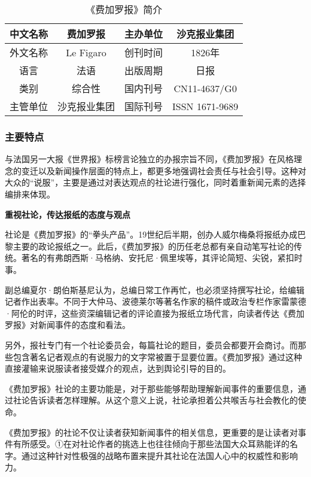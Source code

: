 \documentclass[a4paper,openany]{book}
\begin{document}
\begin{table}[ht]
\setlength{\belowcaptionskip}{5pt}
\caption{《费加罗报》简介}
\centering
\begin{tabular}{|c|c|c|c|}
\hline
中文名称 & 费加罗报      & 主办单位 & 沙克报业集团         \\ \hline
外文名称 & Le Figaro & 创刊时间 & 1826年          \\ \hline
语言   & 法语        & 出版周期 & 日报             \\ \hline
类别   & 综合性       & 国内刊号 & CN11-4637/G0   \\ \hline
主管单位 & 沙克报业集团    & 国际刊号 & ISSN 1671-9689 \\ \hline
\end{tabular}
\end{table}

\subsubsection{主要特点}

与法国另一大报《世界报》标榜言论独立的办报宗旨不同，《费加罗报》在风格理念的变迁以及新闻操作层面的特点上，都更多地强调社会责任与社会引导。这种对大众的“说服”，主要是通过对表达观点的社论进行强化，同时着重新闻元素的选择编排来体现。

\textbf{重视社论，传达报纸的态度与观点}

社论是《费加罗报》的“拳头产品”。19世纪后半期，创办人威尔梅桑将报纸办成巴黎主要的政论报纸之一。此后，《费加罗报》的历任老总都有亲自动笔写社论的传统。著名的有弗朗西斯·马格纳、安托尼·佩里埃等，其评论简短、尖锐，紧扣时事。

副总编夏尔·朗伯斯基尼认为，总编日常工作再忙，也必须坚持撰写社论，给编辑记者作出表率。不同于大仲马、波德莱尔等著名作家的稿件或政治专栏作家雷蒙德·阿伦的时评，这些资深编辑记者的评论直接为报纸立场代言，向读者传达《费加罗报》对新闻事件的态度和看法。

另外，报社专门有一个社论委员会，每篇社论的题目，委员会都要开会商讨。而那些包含著名记者观点的有说服力的文字常被置于显要位置。《费加罗报》通过这种直接灌输来说服读者接受媒介的观点，达到舆论引导的目的。

《费加罗报》社论的主要功能是，对于那些能够帮助理解新闻事件的重要信息，通过社论告诉读者怎样理解。从这个意义上说，社论承担着公共喉舌与社会教化的使命。

《费加罗报》的社论不仅让读者获知新闻事件的相关信息，更重要的是让读者对事件有所感受。①在对社论作者的挑选上也往往倾向于那些法国大众耳熟能详的名字。通过这种针对性极强的战略布置来提升其社论在法国人心中的权威性和影响力。
\end{document}
